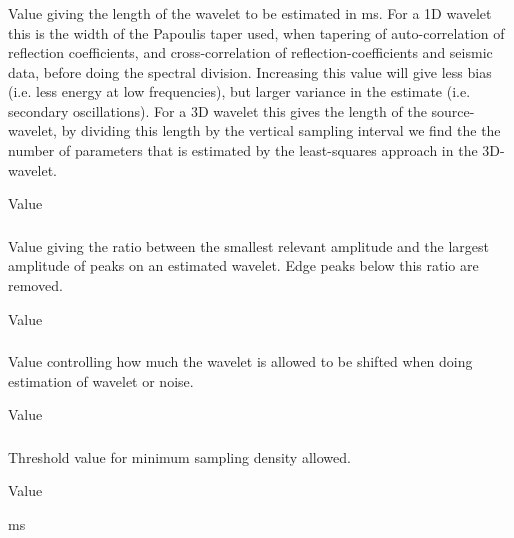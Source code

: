 \subsubsection{}
 \slist
   \item \Description Value giving the length of the wavelet to be estimated in ms. For a 1D wavelet this is the width of the Papoulis taper used, when 
tapering of auto-correlation of reflection coefficients, and cross-correlation of reflection-coefficients and seismic data,
before doing the spectral division.  Increasing this value will give less bias (i.e. less energy at low frequencies), but larger 
variance in the estimate (i.e. secondary oscillations).   For a 3D wavelet this gives the length of the source-wavelet, by dividing this length by 
the vertical sampling interval we find the the number of parameters that is estimated  by the least-squares approach in the 3D-wavelet. 
   \item \Argument Value
   \item {}
 \elist

\subsubsection{}
 \slist
   \item \Description Value giving the ratio between the smallest relevant amplitude and the largest amplitude of peaks on an estimated wavelet. Edge peaks below this ratio are removed.
   \item \Argument Value
   \item {}
 \elist

\subsubsection{}
 \slist
   \item \Description Value controlling how much the wavelet is allowed to be shifted when doing estimation of wavelet or noise.
   \item \Argument Value
   \item {}
 \elist

\subsubsection{}
 \slist
   \item \Description Threshold value for minimum sampling density allowed.
   \item \Argument Value
   \item {} ms
 \elist

